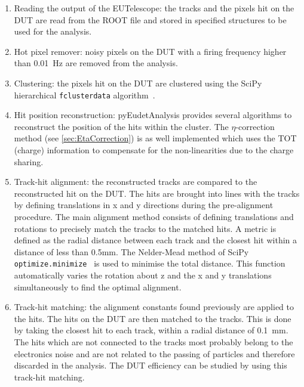 \begin{enumerate}
\item Reading the output of the EUTelescope: the tracks and the pixels
  hit on the DUT are read from the ROOT file and stored in specified
  structures to be used for the analysis.

\item Hot pixel remover: noisy pixels on the DUT with a firing
  frequency higher than 0.01~Hz are removed from the analysis.

\item Clustering: the pixels hit on the DUT are clustered using the
  SciPy hierarchical \texttt{fclusterdata}
  algorithm~\cite{scipyClustering}.

\item Hit position reconstruction: pyEudetAnalysis provides several
  algorithms to reconstruct the position of the hits within the
  cluster. The $\eta$-correction method (see \cref{sec:EtaCorrection})
  is as well implemented which uses the TOT (charge) information to
  compensate for the non-linearities due to the charge sharing.

\item Track-hit alignment: the reconstructed tracks are compared to
  the reconstructed hit on the DUT. The hits are brought into lines
  with the tracks by defining translations in x and y directions
  during the pre-alignment procedure. The main alignment method
  consists of defining translations and rotations to precisely match
  the tracks to the matched hits. A metric is defined as the radial
  distance between each track and the closest hit within a distance of
  less than 0.5mm. The Nelder-Mead method of SciPy
  \texttt{optimize.minimize}~\cite{SciPyOptimizeMinimize} is used to
  minimise the total distance. This function automatically varies the
  rotation about z and the x and y translations simultaneously to find
  the optimal alignment.

\item Track-hit matching: the alignment constants found previously are
  applied to the hits. The hits on the DUT are then matched to the
  tracks. This is done by taking the closest hit to each track, within
  a radial distance of 0.1~mm. The hits which are not connected to the
  tracks most probably belong to the electronics noise and are not
  related to the passing of particles and therefore discarded in the
  analysis. The DUT efficiency can be studied by using this track-hit
  matching.
\end{enumerate}
